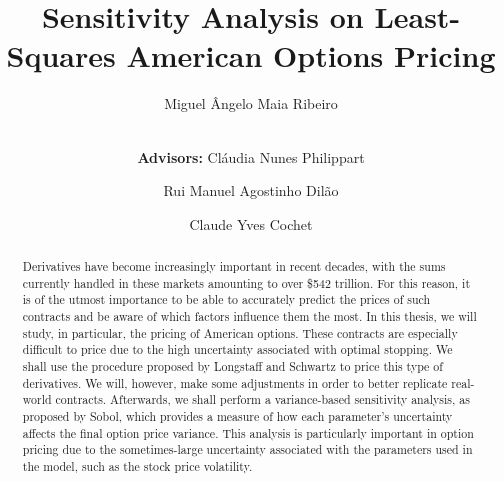 \documentclass[a4paper,twocolumn,aps,prd,longbibliography,superscriptaddress]{revtex4-1}
\begin{document}
\title{Sensitivity Analysis on Least-Squares American Options Pricing}

\author{Miguel Ângelo Maia Ribeiro}

\author{\\[0.3cm]\small{\textbf{Advisors:} Cláudia Nunes Philippart}}
\author{\small{Rui Manuel Agostinho Dilão}}
\author{\small{Claude Yves Cochet}}


\begin{abstract}
\noindent Derivatives have become increasingly important in recent decades, with the sums currently handled in these markets amounting to over \$542 trillion.
For this reason, it is of the utmost importance to be able to accurately predict the prices of such contracts and be aware of which factors influence them the most.
In this thesis, we will study, in particular, the pricing of American options. These contracts are especially difficult to price due to the high uncertainty associated with optimal stopping.
We shall use the procedure proposed by Longstaff and Schwartz to price this type of derivatives. We will, however, make some adjustments in order to better replicate real-world contracts.
Afterwards, we shall perform a variance-based sensitivity analysis, as proposed by Sobol, which provides a measure of how each parameter's uncertainty affects the final option price variance.
This analysis is particularly important in option pricing due to the sometimes-large uncertainty associated with the parameters used in the model, such as the stock price volatility.
\end{abstract}

\maketitle
\end{document}
